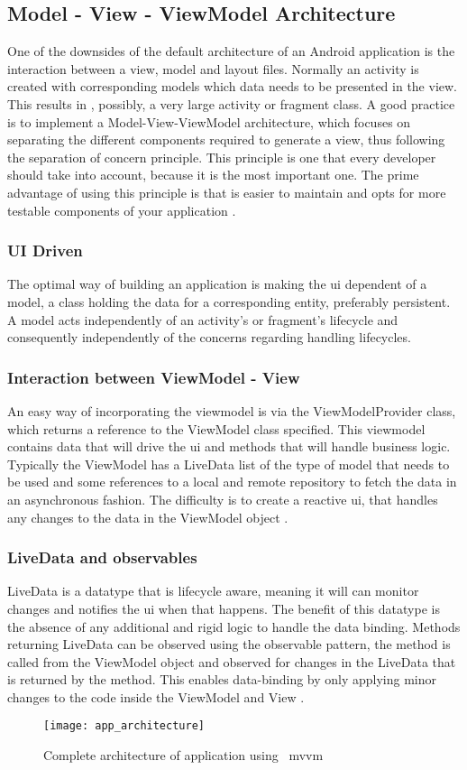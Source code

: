 \subsection{Model - View - ViewModel Architecture}
One of the downsides of the default architecture of an Android application is the interaction between a view, model and layout files. Normally an activity is created with corresponding models which data needs to be presented in the view. This results in , possibly, a very large activity or fragment class. A good practice is to implement a Model-View-ViewModel architecture, which focuses on separating the different components required to generate a view, thus following the separation of concern principle. This principle is one that every developer should take into account, because it is the most important one. The prime advantage of using this principle is that is easier to maintain and opts for more testable components of your application \cite{AndroidDevelopers2019b}.
\subsubsection{UI Driven}
The optimal way of building an application is making the \acrshort{ui} dependent of a model, a class holding the data for a corresponding entity, preferably persistent. A model acts independently of an activity's or fragment's lifecycle and consequently independently of the concerns regarding handling lifecycles.
\subsubsection{Interaction between ViewModel - View}
An easy way of incorporating the viewmodel is via the ViewModelProvider class, which returns a reference to the ViewModel class specified. This viewmodel contains data that will drive the \acrshort{ui} and methods that will handle business logic. Typically the ViewModel has a LiveData list of the type of model that needs to be used and some references to a local and remote repository to fetch the data in an asynchronous fashion. The difficulty is to create a reactive \acrshort{ui}, that handles any changes to the data in the ViewModel object \cite{JaewoongEum2018}.
\subsubsection{LiveData and observables}
LiveData is a datatype that is lifecycle aware, meaning it will can monitor changes and notifies the \acrshort{ui} when that happens. The benefit of this datatype is the absence of any additional and rigid logic to handle the data binding. Methods returning LiveData can be observed using the observable pattern, the method is called from the ViewModel object and observed for changes in the LiveData that is returned by the method. This enables data-binding by only applying minor changes to the code inside the ViewModel and View \cite{AndroidDevelopers2019b}.
\begin{figure}[h!]
\texttt{[image: app\_architecture]}
\centering
\caption{Complete architecture of application using ~\acrshort{mvvm}~\cite{AndroidDevelopers2019b}}
\end{figure}
